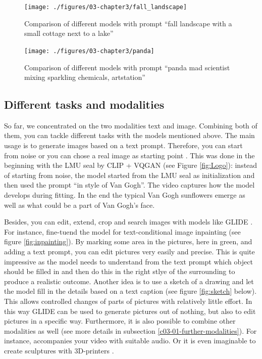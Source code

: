 \documentclass[
]{krantz}
\begin{document}
\begin{figure}

{\centering \texttt{[image: ./figures/03-chapter3/fall\_landscape]} 

}

\caption{Comparison of different models with prompt ``fall landscape with a small cottage next to a lake''}\label{fig:comparison1}
\end{figure}



\begin{figure}

{\centering \texttt{[image: ./figures/03-chapter3/panda]} 

}

\caption{Comparison of different models with prompt ``panda mad scientist mixing sparkling chemicals, artstation''}\label{fig:comparison2}
\end{figure}



\hypertarget{different-tasks-and-modalities}{%
\subsection{Different tasks and modalities}\label{different-tasks-and-modalities}}

So far, we concentrated on the two modalities text and image. Combining both of them, you can tackle different tasks with the models mentioned above. The main usage is to generate images based on a text prompt. Therefore, you can start from noise or you can chose a real image as starting point \citep{qiao2022initial}. This was done in the beginning with the LMU seal by CLIP + VQGAN (see Figure \ref{fig:Logo}): instead of starting from noise, the model started from the LMU seal as initialization and then used the prompt ``in style of Van Gogh''. The video captures how the model develops during fitting. In the end the typical Van Gogh sunflowers emerge as well as what could be a part of Van Gogh's face.

Besides, you can edit, extend, crop and search images with models like GLIDE \citep{GLIDE}. For instance, \citet{GLIDE} fine-tuend the model for text-conditional image inpainting (see figure \ref{fig:inpainting}). By marking some area in the pictures, here in green, and adding a text prompt, you can edit pictures very easily and precise. This is quite impressive as the model needs to understand from the text prompt which object should be filled in and then do this in the right stlye of the surrounding to produce a realistic outcome. Another idea is to use a sketch of a drawing and let the model fill in the details based on a text caption (see figure \ref{fig:sketch} below). This allows controlled changes of parts of pictures with relatively little effort. In this way GLIDE can be used to generate pictures out of nothing, but also to edit pictures in a specific way. Furthermore, it is also possible to combine other modalities as well (see more details in subsection \ref{c03-01-further-modalities}). For instance, \citet{WZRD} accompanies your video with suitable audio. Or it is even imaginable to create sculptures with 3D-printers \citep{3D}.
\end{document}

